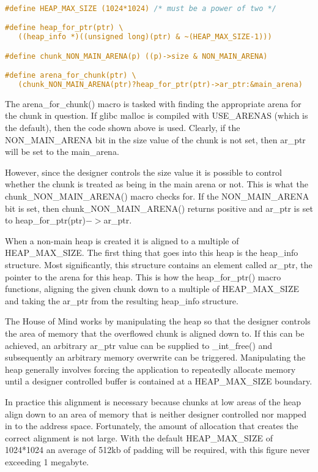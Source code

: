 \documentclass[12pt]{article}
\begin{document}
\begin{lstlisting}[language=C]

#define HEAP_MAX_SIZE (1024*1024) /* must be a power of two */

#define heap_for_ptr(ptr) \
   ((heap_info *)((unsigned long)(ptr) & ~(HEAP_MAX_SIZE-1)))

#define chunk_NON_MAIN_ARENA(p) ((p)->size & NON_MAIN_ARENA)

#define arena_for_chunk(ptr) \
   (chunk_NON_MAIN_ARENA(ptr)?heap_for_ptr(ptr)->ar_ptr:&main_arena)
\end{lstlisting}

The arena\_for\_chunk() macro is tasked with finding the appropriate
arena for the chunk in question. If glibc malloc is compiled with
USE\_ARENAS (which is the default), then the code shown above is
used. Clearly, if the NON\_MAIN\_ARENA bit in the size value of the
chunk is not set, then ar\_ptr will be set to the main\_arena.
\newline


However, since the designer controls the size value it is possible
to control whether the chunk is treated as being in the main arena
or not. This is what the chunk\_NON\_MAIN\_ARENA() macro checks for.
If the NON\_MAIN\_ARENA bit is set, then chunk\_NON\_MAIN\_ARENA()
returns positive and ar\_ptr is set to heap\_for\_ptr(ptr)$->$ar\_ptr.
\newline


When a non-main heap is created it is aligned to a multiple of
HEAP\_MAX\_SIZE. The first thing that goes into this heap is the
heap\_info structure. Most significantly, this structure contains an
element called ar\_ptr, the pointer to the arena for this heap. This
is how the heap\_for\_ptr() macro functions, aligning the given chunk
down to a multiple of HEAP\_MAX\_SIZE and taking the ar\_ptr from the
resulting heap\_info structure.
\newline


The House of Mind works by manipulating the heap so that the
designer controls the area of memory that the overflowed chunk is
aligned down to. If this can be achieved, an arbitrary ar\_ptr value
can be supplied to \_int\_free() and subsequently an arbitrary memory
overwrite can be triggered. Manipulating the heap generally
involves forcing the application to repeatedly allocate memory
until a designer controlled buffer is contained at a HEAP\_MAX\_SIZE
boundary.
\newline


In practice this alignment is necessary because chunks at low areas
of the heap align down to an area of memory that is neither
designer controlled nor mapped in to the address space.
Fortunately, the amount of allocation that creates the correct
alignment is not large. With the default HEAP\_MAX\_SIZE of 1024*1024
an average of 512kb of padding will be required, with this figure
never exceeding 1 megabyte.
\newline
\end{document}

